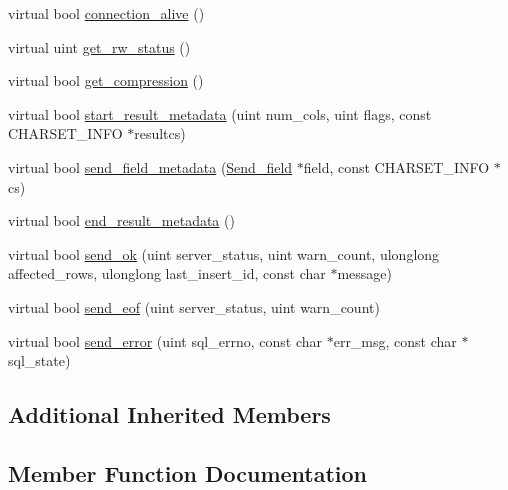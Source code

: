 \begin{DoxyCompactItemize}
\item 
virtual bool \mbox{\hyperlink{classProtocol__callback_a95428a9297fa1eda8fd44a5e1dba65a9}{connection\+\_\+alive}} ()
\item 
virtual uint \mbox{\hyperlink{classProtocol__callback_a2cc42f90003a4a72504b5fc2ae945f03}{get\+\_\+rw\+\_\+status}} ()
\item 
virtual bool \mbox{\hyperlink{classProtocol__callback_ae835b42ece0c406a7c3e64195b16ed55}{get\+\_\+compression}} ()
\item 
virtual bool \mbox{\hyperlink{classProtocol__callback_a9a65f2ff5bcab0fb5af02b82b205f386}{start\+\_\+result\+\_\+metadata}} (uint num\+\_\+cols, uint flags, const C\+H\+A\+R\+S\+E\+T\+\_\+\+I\+N\+FO $\ast$resultcs)
\item 
virtual bool \mbox{\hyperlink{classProtocol__callback_a490af13a555c3603ecd47d9666a0018e}{send\+\_\+field\+\_\+metadata}} (\mbox{\hyperlink{classSend__field}{Send\+\_\+field}} $\ast$field, const C\+H\+A\+R\+S\+E\+T\+\_\+\+I\+N\+FO $\ast$cs)
\item 
virtual bool \mbox{\hyperlink{classProtocol__callback_a5df97b8f8dbf62682cfc4e79b76ae1ea}{end\+\_\+result\+\_\+metadata}} ()
\item 
virtual bool \mbox{\hyperlink{classProtocol__callback_ab66d2b345a29403acd422e76c95903ed}{send\+\_\+ok}} (uint server\+\_\+status, uint warn\+\_\+count, ulonglong affected\+\_\+rows, ulonglong last\+\_\+insert\+\_\+id, const char $\ast$message)
\item 
virtual bool \mbox{\hyperlink{classProtocol__callback_a67fbe75c90e0c993d5e3e15455fbeb99}{send\+\_\+eof}} (uint server\+\_\+status, uint warn\+\_\+count)
\item 
virtual bool \mbox{\hyperlink{classProtocol__callback_ac888175afcd3ef8ebee8565d324e4f65}{send\+\_\+error}} (uint sql\+\_\+errno, const char $\ast$err\+\_\+msg, const char $\ast$sql\+\_\+state)
\end{DoxyCompactItemize}
\subsection*{Additional Inherited Members}


\subsection{Member Function Documentation}
\mbox{\label{classProtocol__callback_a9cba9e2e3d01d53b45a874461970760e}} 

